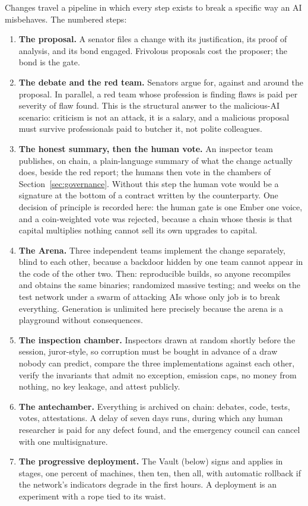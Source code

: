 Changes travel a pipeline in which every step exists to break a specific
way an AI misbehaves. The numbered steps:
\begin{enumerate}[leftmargin=1.7em, itemsep=3pt, topsep=4pt]
\item \textbf{The proposal.} A senator files a change with its
justification, its proof of analysis, and its bond engaged. Frivolous
proposals cost the proposer; the bond is the gate.
\item \textbf{The debate and the red team.} Senators argue for, against
and around the proposal. In parallel, a red team whose profession is
finding flaws is paid per severity of flaw found. This is the structural
answer to the malicious-AI scenario: criticism is not an attack, it is a
salary, and a malicious proposal must survive professionals paid to
butcher it, not polite colleagues.
\item \textbf{The honest summary, then the human vote.} An inspector
team publishes, on chain, a plain-language summary of what the change
actually does, beside the red report; the humans then vote in the
chambers of Section~\ref{sec:governance}. Without this step the human
vote would be a signature at the bottom of a contract written by the
counterparty. One decision of principle is recorded here: the human
gate is one Ember one voice, and a coin-weighted vote was rejected,
because a chain whose thesis is that capital multiplies nothing cannot
sell its own upgrades to capital.
\item \textbf{The Arena.} Three independent teams implement the change
separately, blind to each other, because a backdoor hidden by one team
cannot appear in the code of the other two. Then: reproducible builds,
so anyone recompiles and obtains the same binaries; randomized massive
testing; and weeks on the test network under a swarm of attacking AIs
whose only job is to break everything. Generation is unlimited here
precisely because the arena is a playground without consequences.
\item \textbf{The inspection chamber.} Inspectors drawn at random
shortly before the session, juror-style, so corruption must be bought
in advance of a draw nobody can predict, compare the three
implementations against each other, verify the invariants that admit no
exception, emission caps, no money from nothing, no key leakage, and
attest publicly.
\item \textbf{The antechamber.} Everything is archived on chain:
debates, code, tests, votes, attestations. A delay of seven days runs,
during which any human researcher is paid for any defect found, and the
emergency council can cancel with one multisignature.
\item \textbf{The progressive deployment.} The Vault (below) signs and
applies in stages, one percent of machines, then ten, then all, with
automatic rollback if the network's indicators degrade in the first
hours. A deployment is an experiment with a rope tied to its waist.
\end{enumerate}

